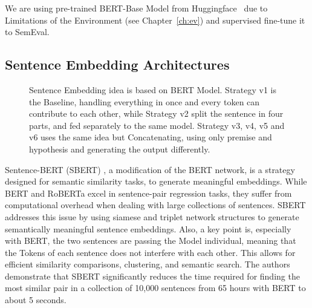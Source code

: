 We are using pre-trained BERT-Base Model from Huggingface~\cite{noauthor_hugging_2024-1} due to Limitations
of the Environment (see Chapter~\ref{ch:ev}) and supervised fine-tune it to SemEval.














\subsection{Sentence Embedding Architectures}\label{ch:seb}
\begin{figure}[h]
    \vspace{-1cm}
    \centering
    \resizebox{\textwidth}{!}{}
    \caption{Sentence Embedding idea is based on BERT Model. Strategy v1 is the
             Baseline, handling everything in once and every token can contribute to each other, while
             Strategy v2 split the sentence in four parts, and fed separately to the same
             model. Strategy v3, v4, v5 and v6
             uses the same idea but Concatenating, using only premise and hypothesis and generating the output differently.}\label{fig:ver}
\end{figure}

Sentence-BERT (SBERT) \cite{reimers_sentence-bert_2019}, a modification of the BERT \cite{devlin_bert_2019} network, is a strategy designed for 
semantic similarity tasks, to generate meaningful embeddings. While BERT \cite{devlin_bert_2019} and RoBERTa \cite{liu_roberta_2019} excel in sentence-pair 
regression tasks, they suffer from computational overhead when dealing with large 
collections of sentences. SBERT addresses this issue by using 
siamese and triplet network structures to generate semantically meaningful 
sentence embeddings. Also, a key point is, especially with BERT, the two sentences are 
passing the Model individual, meaning that the Tokens of each sentence does not interfere
with each other. This allows for efficient similarity comparisons, 
clustering, and semantic search.
The authors demonstrate that SBERT significantly reduces the time required for 
finding the most similar pair in a collection of 10,000 sentences from 65 
hours with BERT to about 5 seconds.

